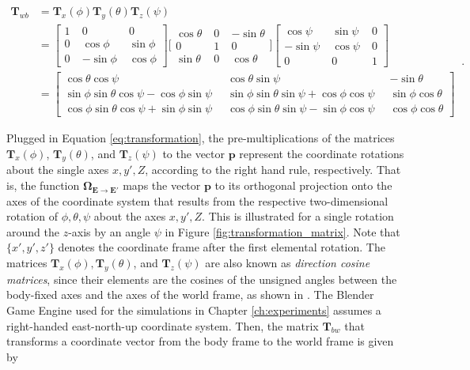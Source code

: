\begin{equation}\label{eq:transformation_matrices}
\begin{split}
\bm{T}_{wb} & = \bm{T}_x(\phi) \bm{T}_y(\theta) \bm{T}_z(\psi) \\
 & = {\left[ \begin{smallmatrix}
    1 \; & 0 \; & 0 \\
    0 \; & \cos \phi \; & \sin \phi \\
    0 \; & -\sin \phi \; & \cos \phi
    \end{smallmatrix}\right]}
    {\bigg[ \begin{smallmatrix}
    \cos \theta \; & 0 \; & -\sin \theta \\
    0 \; & 1 \; & 0 \\
    \sin \theta \; & 0 \; & \cos \theta
    \end{smallmatrix} \bigg]}
    {\left[\begin{smallmatrix}
    \cos \psi \; & \sin \psi \; & 0 \\
    -\sin \psi \; & \cos \psi \; & 0 \\
    0 \; & 0 \; & 1
    \end{smallmatrix}\right]}\\
 & = {\left[\begin{smallmatrix}
   \cos \theta \cos \psi \; &
    \cos \theta \sin \psi \; &
   -\sin \theta \\
    \sin \phi \sin \theta \cos \psi - \cos \phi \sin \psi \;\; &
    \sin \phi \sin \theta \sin \psi + \cos \phi \cos \psi \;\; &
    \sin \phi \cos \theta \\
    \cos \phi \sin \theta \cos \psi + \sin \phi \sin \psi \;\; &
    \cos \phi \sin \theta \sin \psi - \sin \phi \cos \psi \;\; &
    \cos \phi \cos \theta
  \end{smallmatrix}\right]}
\end{split}\,.
\end{equation}

\noindent
Plugged in Equation \ref{eq:transformation}, the pre-multiplications of the matrices $\bm{T}_x(\phi)$, $\bm{T}_y(\theta)$, and $\bm{T}_z(\psi)$ to the vector $\bm{p}$ represent the coordinate rotations about the single axes $x, y', Z$, according to the right hand rule, respectively. That is, the function $\bm{\Omega}_{\bm{E} \rightarrow \bm{E}'}$ maps the vector $\bm{p}$ to its orthogonal projection onto the axes of the coordinate system that results from the respective two-dimensional rotation of $\phi, \theta, \psi$ about the axes $x, y', Z$. This is illustrated for a single rotation around the $z$-axis by an angle $\psi$ in Figure \ref{fig:transformation_matrix}. Note that $\{x', y', z'\}$ denotes the coordinate frame after the first elemental rotation. The matrices $\bm{T}_x(\phi), \bm{T}_y(\theta)$, and $\bm{T}_z(\psi)$ are also known as \emph{direction cosine matrices}, since their elements are the cosines of the unsigned angles between the body-fixed axes and the axes of the world frame, as shown in \cite{diebel2006attitude}. The Blender Game Engine \cite{blender} used for the simulations in Chapter \ref{ch:experiments} assumes a right-handed east-north-up coordinate system. Then, the matrix $\bm{T}_{bw}$ that transforms a coordinate vector from the body frame to the world frame is given by


